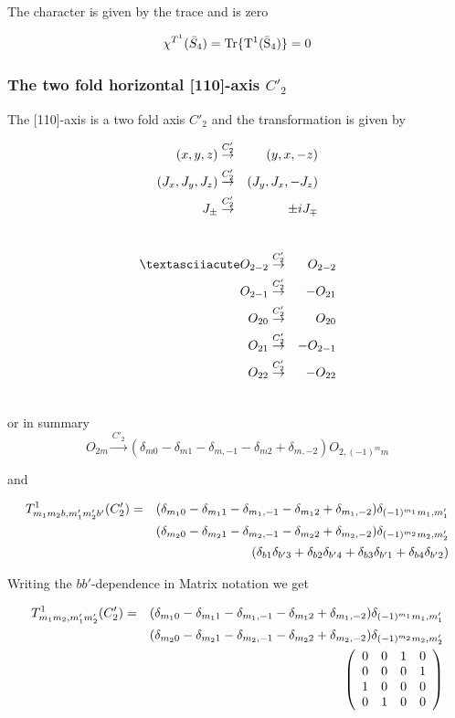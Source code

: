 The character is given by the trace and is zero

\begin{equation}
\chi^{T^1}(\bar S_4)=\rm Tr \{ T^1(\bar S_4) \}=0
\end{equation}


\subsubsection{The two fold horizontal [110]-axis  $C'_2$}

 The    [110]-axis is a two fold axis $C'_2$ and the transformation is given by

\begin{eqnarray}
(x,y,z) &\stackrel{C'_2}{\rightarrow}& (y,x,-z) \\ \nonumber
(J_x,J_y,J_z) &\stackrel{C'_2}{\rightarrow}&  (J_y,J_x,-J_z) \\ \nonumber
J_\pm &\stackrel{C'_2}{\rightarrow}& \pm i J_\mp \\ \nonumber
\end{eqnarray}

\begin{eqnarray}
´O_{2-2}&\stackrel{C'_2}{\rightarrow}&O_{2-2} \nn
O_{2-1}&\stackrel{C'_2}{\rightarrow}&-O_{21} \nn
O_{20}&\stackrel{C'_2}{\rightarrow}&O_{20} \nn
O_{21}&\stackrel{C'_2}{\rightarrow}&-O_{2-1}\nn
O_{22}&\stackrel{C'_2}{\rightarrow}&-O_{22}\nn
\end{eqnarray}

or in summary
\begin{equation}
O_{2m}\stackrel{C'_2}{\rightarrow} (\delta_{m0}-\delta_{m1}-\delta_{m,-1}-\delta_{m2}+\delta_{m,-2}) O_{2,(-1)^mm} 
\end{equation}

and 

\begin{eqnarray}
T^1_{m_1m_2b,m'_1m'_2b'}(C'_2)&=&(\delta_{m_10}-\delta_{m_11}-\delta_{m_1,-1}-\delta_{m_12}+\delta_{m_1,-2})
\delta_{(-1)^{m_1}m_1,m'_1}\\ \nonumber
&&(\delta_{m_20}-\delta_{m_21}-\delta_{m_2,-1}-\delta_{m_22}+\delta_{m_2,-2})
\delta_{(-1)^{m_2}m_2,m'_2}\\ \nonumber
&&(\delta_{b1}\delta_{b'3}+\delta_{b2}\delta_{b'4}+\delta_{b3}\delta_{b'1}+\delta_{b4}\delta_{b'2})
\end{eqnarray}

Writing the $bb'$-dependence in Matrix notation we get

\begin{eqnarray}\label{Cd2}
T^1_{m_1m_2,m'_1m'_2}(C'_2)&=&(\delta_{m_10}-\delta_{m_11}-\delta_{m_1,-1}-\delta_{m_12}+\delta_{m_1,-2})
\delta_{(-1)^{m_1}m_1,m'_1}\\ \nonumber
&&(\delta_{m_20}-\delta_{m_21}-\delta_{m_2,-1}-\delta_{m_22}+\delta_{m_2,-2})
\delta_{(-1)^{m_2}m_2,m'_2}\\ \nonumber
&&\left (
\begin{array}{cccc}
0 & 0 & 1 & 0 \\
0 & 0 & 0 & 1 \\
1 & 0 & 0 & 0 \\
0 & 1 & 0 & 0 
\end{array} \right )
\end{eqnarray}

